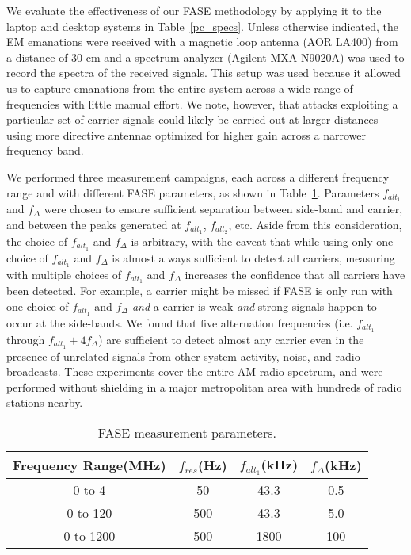 
We evaluate the effectiveness of our FASE methodology by applying it to the laptop and desktop systems in Table~\ref{pc_specs}. Unless otherwise indicated, the EM emanations were received with a magnetic loop antenna (AOR LA400) from a distance of 30 cm and a spectrum analyzer (Agilent MXA N9020A) was used to record the spectra of the received signals. This setup was used because it allowed us to capture emanations from the entire system across a wide range of frequencies with little manual effort. We note, however, that attacks exploiting a particular set of carrier signals could likely be carried out at larger distances using more directive antennae optimized for higher gain across a narrower frequency band. 

We performed three measurement campaigns, each across a different frequency range and with different FASE parameters, as shown in Table~\ref{meas_params}. Parameters $f_{alt_1}$ and $f_\Delta$ were chosen to ensure sufficient separation between side-band and carrier, and between the peaks generated at $f_{alt_1}$, $f_{alt_2}$, etc. Aside from this consideration, the choice of $f_{alt_1}$ and $f_\Delta$ is arbitrary, with the caveat that while using only one choice of $f_{alt_1}$ and $f_\Delta$ is almost always sufficient to detect all carriers, measuring with multiple choices of $f_{alt_1}$ and $f_\Delta$ increases the confidence that all carriers have been detected. For example, a carrier might be missed if FASE is only run with one choice of $f_{alt_1}$ and $f_\Delta$ \textit{and} a carrier is weak \textit{and} strong signals happen to occur at the side-bands. We found that five alternation frequencies (i.e. $f_{alt_1}$ through $f_{alt_1}+4f_\Delta$) are sufficient to detect almost any carrier even in the presence of unrelated signals from other system activity, noise, and radio broadcasts. These experiments cover the entire AM radio spectrum, and were performed without shielding in a major metropolitan area with hundreds of radio stations nearby.

\begin{table}[htb]%
  \small%
  \centering%
    \begin{tabular}{cccc}%
    \toprule
    \textbf{Frequency Range(MHz)} & \textbf{$f_{res}$(Hz)} & \textbf{$f_{alt_1}$(kHz)} & \textbf{$f_\Delta$(kHz)} \\
    \midrule
    0 to 4 & 50 & 43.3 & 0.5 \\
    0 to 120 & 500 & 43.3 & 5.0 \\
    0 to 1200 & 500 & 1800 & 100 \\
    \bottomrule
    \end{tabular}%
  \caption{FASE measurement parameters.}%
  \label{meas_params}%
\end{table}%


